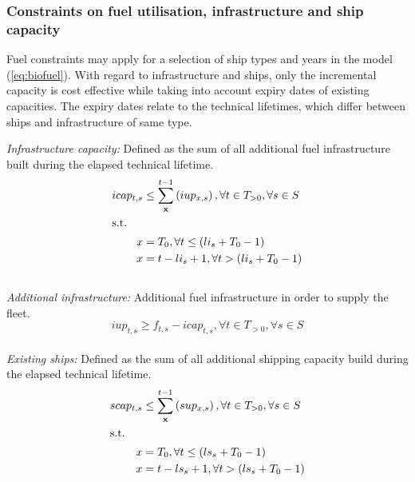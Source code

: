 \documentclass[article]{elsarticle}
\begin{document}
\subsubsection{Constraints on fuel utilisation, infrastructure and ship capacity}
Fuel constraints may apply for a selection of ship types and years in the model (\autoref{eq:biofuel}). With regard to infrastructure and ships, only the incremental capacity is cost effective while taking into account expiry dates of existing capacities. The expiry dates relate to the technical lifetimes, which differ between ships and infrastructure of same type.\\\par\noindent
\textit{Infrastructure capacity: }Defined as the sum of all additional fuel infrastructure built during the elapsed technical lifetime.
\begin{subequations}
    \begin{align}
        icap_{t,s} &\leq \sum_{\textbf{x}}^{t-1} \left( iup_{x,s} \right), \forall t \in T_{>0}, \forall s \in S\label{eq:icap}\\
        \intertext{s.t.}
        x &= T_0, \forall t \leq \left(li_{s} + T_0 - 1\right)\\
        x &= t - li_{s} + 1, \forall t > \left(li_{s} + T_0 - 1\right)
    \end{align}
\end{subequations}\\
\textit{Additional infrastructure: }Additional fuel infrastructure in order to supply the fleet.
\begin{equation}
    iup_{t,s} \geq f_{t,s} - icap_{t,s}, \forall t \in T_{>0}, \forall s \in S\label{eq:iup}
\end{equation}\\
\textit{Existing ships: }Defined as the sum of all additional shipping capacity build during the elapsed technical lifetime.
\begin{subequations}
    \begin{align}
        scap_{t,s} &\leq \sum_{\textbf{x}}^{t-1} \left(sup_{x,s} \right), \forall t \in T_{>0}, \forall s \in S\label{eq:scap}\\
        \intertext{s.t.}
        x &= T_0, \forall t \leq \left(ls_{s} + T_0 - 1\right)\\
        x &= t - ls_{s} + 1, \forall t > \left(ls_{s} + T_0 - 1\right)
    \end{align}
\end{subequations}\\
\end{document}
